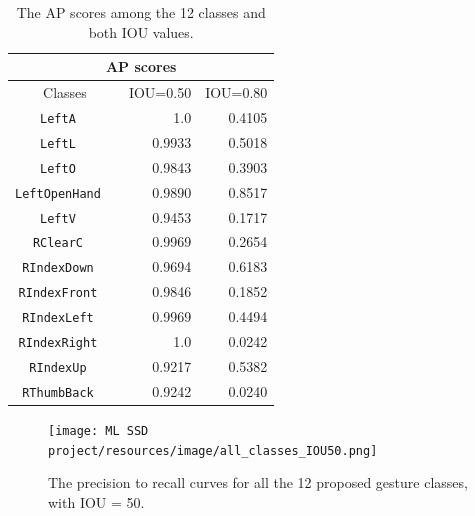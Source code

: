 \documentclass[10pt,twocolumn,letterpaper]{article}
\begin{document}
\begin{flushleft}
\def\arraystretch{1.2}%
\begin{table}[!h]
    \begin{center}    
        \begin{tabular}{l|r|r|r}
        \hline
        \multicolumn{4}{c}{AP scores}\\
        \hline
        \hline
        \multicolumn{2}{c|}{Classes} & IOU=0.50 & IOU=0.80  \\
        \hline
        \multicolumn{1}{c}{\texttt{LeftA}} &  & 1.0 & 0.4105 \\
        \hline
        \multicolumn{1}{c}{\texttt{LeftL}} &  & 0.9933 & 0.5018 \\
        \hline
        \multicolumn{1}{c}{\texttt{LeftO}} &  & 0.9843 & 0.3903 \\
        \hline
        \multicolumn{1}{c}{\texttt{LeftOpenHand}} &  & 0.9890 & 0.8517 \\
        \hline
        \multicolumn{1}{c}{\texttt{LeftV}} &  & 0.9453 & 0.1717 \\
        \hline
        \multicolumn{1}{c}{\texttt{RClearC}} &  & 0.9969 & 0.2654 \\
        \hline
        \multicolumn{1}{c}{\texttt{RIndexDown}} &  & 0.9694 & 0.6183 \\
        \hline
        \multicolumn{1}{c}{\texttt{RIndexFront}} &  & 0.9846 & 0.1852 \\
        \hline
        \multicolumn{1}{c}{\texttt{RIndexLeft}} &  & 0.9969 & 0.4494 \\
        \hline
        \multicolumn{1}{c}{\texttt{RIndexRight}} &  & 1.0 & 0.0242 \\
        \hline
        \multicolumn{1}{c}{\texttt{RIndexUp}} &  & 0.9217 & 0.5382 \\
        \hline
        \multicolumn{1}{c}{\texttt{RThumbBack}} &  & 0.9242 & 0.0240 \\
        \hline
        \end{tabular}
    \end{center}
    \caption{The AP scores among the 12 classes and both IOU values.}
    \label{table1}
\end{table}

\begin{figure}[!h]
    \centering
    \texttt{[image: ML SSD project/resources/image/all\_classes\_IOU50.png]}
    \caption{The precision to recall curves for all the 12 proposed gesture classes, with IOU = 50.}
\end{figure}
\label{figure7}


\end{flushleft}
\end{document}
